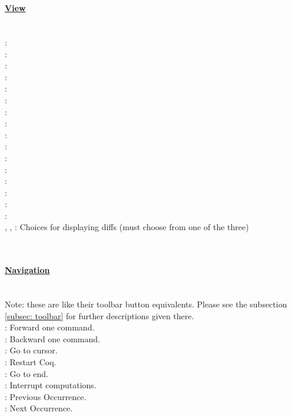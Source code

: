 ~\\
\paragraph{\underline{View}}
~\\
 : 
\\
 : 
\\
 : 
\\
 : 
\\
 : 
\\
 : 
\\
 : 
\\
 : 
\\
 : 
\\
 : 
\\
 : 
\\
 : 
\\
 : 
\\
 : 
\\
 : 
\\
 : 
\\
, ,  : Choices for displaying diffs (must choose from one of the three)

	
	
	
~\\
\paragraph{\underline{Navigation}}
~\\
Note: these are like their toolbar button equivalents. 
Please see the subsection \ref{subsec: toolbar} for further descriptions given there. 
\\
 : Forward one command. 
\\ 
 : Backward one command. 
\\
 : Go to cursor. 
\\
 : Restart Coq. 
\\
 : Go to end. 
\\
 : Interrupt computations. 
\\
 : Previous Occurrence. 
\\
 : Next Occurrence. 




